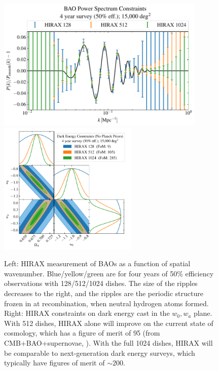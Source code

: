 \documentclass[letterpaper,11pt,preprint]{aastex}
\begin{document}
\begin{figure}[tbh]
  \includegraphics[height=2.5in]{hirax_bao_ps.pdf}
  \includegraphics[height=2.5in]{hirax_de_constraints.pdf}
\caption{\small Left: HIRAX measurement of BAOs as a function of
  spatial wavenumber.  Blue/yellow/green are for four years of 50\%
  efficiency observations with 128/512/1024 dishes.  The size of the
  ripples decreases to the right, and the ripples are the periodic
  structure frozen in at recombination, when neutral hydrogen atoms
  formed.  Right: HIRAX constraints on dark energy cast in the
  $w_0,w_a$ plane.  With 512 dishes, HIRAX alone will improve on the
  current state of cosmology, which has a figure of merit of 95 (from
  CMB+BAO+supernovae, \citet{Planck2018Params}).  With the full 1024
  dishes, HIRAX will be comparable to next-generation dark energy
  surveys, which typically have figures of merit of $\sim 200$.
  \label{fig:hirax_de}
}
\end{figure}
\end{document}
